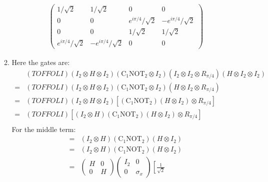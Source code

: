 \documentclass[12pt,a4]{article}
\begin{document}
\begin{enumerate}
\begin{enumerate}
\begin{align*}
          \left(
            \begin{matrix}
              1/\sqrt{2}                  & 1/\sqrt{2}                  & 0                         & 0\\
              0                           & 0                           & e^{i \pi / 4}/\sqrt{2} & - e^{i \pi / 4} / \sqrt{2}\\
              0                           & 0                           & 1 /\sqrt{2}               & 1 /\sqrt{2}\\
              e^{i \pi / 4}/\sqrt{2}   & -e^{i \pi / 4}/\sqrt{2}  & 0                         & 0
            \end{matrix}
          \right)
        \end{align*}
      \item
        Here the gates are:
        \begin{align*}
            & (TOFFOLI)(I_2 \otimes H \otimes I_2)(\text{C}_1\text{NOT}_2 \otimes I_2)(I_2 \otimes I_2 \otimes R_{\pi / 4})(H \otimes I_2 \otimes I_2)\\
          = & (TOFFOLI)(I_2 \otimes H \otimes I_2)(\text{C}_1\text{NOT}_2 \otimes I_2)(H \otimes I_2 \otimes R_{\pi / 4})\\
          = & (TOFFOLI)(I_2 \otimes H \otimes I_2)\left[(\text{C}_1\text{NOT}_2) (H \otimes I_2)\otimes R_{\pi / 4}\right] \\
          = & (TOFFOLI)\left[(I_2 \otimes H)(\text{C}_1\text{NOT}_2) (H \otimes I_2)\otimes R_{\pi / 4}\right] \\
        \end{align*}
        For the middle term:
        \begin{align*}
          = & (I_2 \otimes H)(\text{C}_1\text{NOT}_2) (H \otimes I_2) \\
          = & (I_2 \otimes H)(\text{C}_1\text{NOT}_2) (H \otimes I_2) \\
          = &
              \left(
                \begin{matrix}
                  H & 0 \\
                  0 & H 
                \end{matrix}
              \right)
              \left(
                \begin{matrix}
                  I_2 & 0 \\
                  0   & \sigma_x
                \end{matrix}
              \right)
              \left[
              \frac{1}{\sqrt{2}}

\end{align*}
\end{enumerate}
\end{enumerate}
\end{document}
